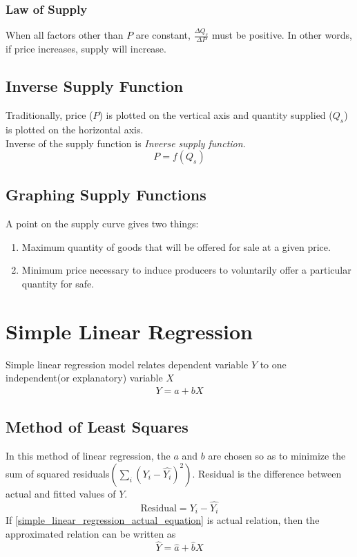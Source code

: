 \documentclass[oneside]{book}
\begin{document}
\subsubsection{Law of Supply}
When all factors other than \(P\) are constant, \(\displaystyle \frac{\Delta Q_s}{\Delta P}\) must be positive. In other words, if price increases, supply will increase.

\subsection{Inverse Supply Function}
Traditionally, price (\(P\)) is plotted on the vertical axis and quantity supplied (\(Q_s\)) is plotted on the horizontal axis.\\
Inverse of the supply function is \textit{Inverse supply function}.
\[
	P = f(Q_s)
\]

\subsection{Graphing Supply Functions}
A point on the supply curve gives two things:
\begin{enumerate}
	\item Maximum quantity of goods that will be offered for sale at a given price.
	\item Minimum price necessary to induce producers to voluntarily offer a particular quantity for safe.
\end{enumerate}

\section{Simple Linear Regression}
Simple linear regression model relates dependent variable \(Y\) to one independent(or explanatory) variable \(X\)
\begin{align}
	Y = a + bX
	\label{simple_linear_regression_actual_equation}
\end{align}
\subsection{Method of Least Squares}
In this method of linear regression, the \(a\) and \(b\) are chosen so as to minimize the sum of squared residuals\((\sum_{i}(Y_i - \hat{Y_i})^2)\).
Residual is the difference between actual and fitted values of \(Y\).
\[
	\text{Residual} = Y_i - \hat{Y_i}
\]
If \cref{simple_linear_regression_actual_equation} is actual relation, then the approximated relation can be written as
\[
	\hat{Y} = \hat{a} + \hat{b}X
\]




\end{document}
